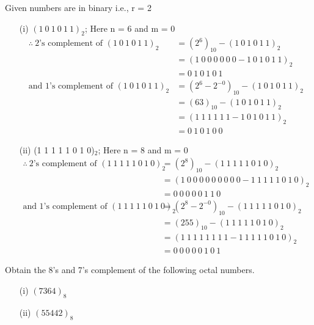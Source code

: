 \begin{solution}
Given numbers are in binary i.e., r = 2
\begin{itemize}
\item[(i)] $(1~0~1~0~1~1)_{2}$\qquad ; Here n = 6 and m = 0
\begin{align*}
\therefore~ \text{2's complement of } (1~0~1~0~1~1)_{2} &= (2^{6})_{10}-(1~0~1~0~1~1)_{2}\\[3pt]
&= (1~0~0~0~0~0~0-1~0~1~0~1~1)_{2}\\[3pt]
&= 0~1~0~1~0~1\\[3pt]
\text{and 1's complement of } (1~0~1~0~1~1)_{2} &= (2^{6}-2^{-0})_{10}-(1~0~1~0~1~1)_{2}\\[3pt]
&= (63)_{10}-(1~0~1~0~1~1)_{2}\\[3pt]
&= (1~1~1~1~1~1-1~0~1~0~1~1)_{2}\\[3pt]
&= 0~1~0~1~0~0
\end{align*}

\item[(ii)] (1 1 1 1 1 0 1 0)$_{2}$\qquad ; Here n = 8 and m = 0
\begin{align*}
\therefore~ \text{2's complement of } (1~1~1~1~1~0~1~0)_{2} &= (2^{8})_{10}-(1~1~1~1~1~0~1~0)_{2}\\[3pt]
&= (1~0~0~0~0~0~0~0~0~0-1~1~1~1~1~0~1~0)_{2}\\[2pt]
&= 0~0~0~0~0~1~1~0\\[3pt]
\text{and 1's complement of } (1~1~1~1~1~0~1~0)_{2} &= (2^{8}-2^{-0})_{10}-(1~1~1~1~1~0~1~0)_{2}\\[3pt]
&= (255)_{10}-(1~1~1~1~1~0~1~0)_{2}\\[3pt]
&= (1~1~1~1~1~1~1~1-1~1~1~1~1~0~1~0)_{2}\\[3pt]
&= 0~0~0~0~0~1~0~1
\end{align*}
\end{itemize}
\end{solution}

\begin{problem}\label{prob5.25}
Obtain the 8's and 7's complement of the following octal numbers.
\begin{itemize}
\item[(i)] $(7364)_{8}$

\item[(ii)] $(55442)_{8}$
\end{itemize}
\end{problem}

